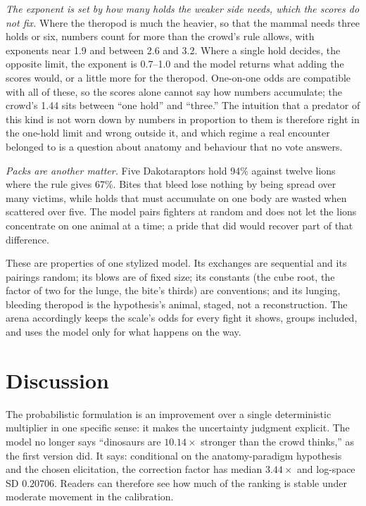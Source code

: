 \documentclass[11pt]{article}
\begin{document}
\emph{The exponent is set by how many holds the weaker side needs, which the scores do not fix.} Where the theropod is much the heavier, so that the mammal needs three holds or six, numbers count for more than the crowd's rule allows, with exponents near 1.9 and between 2.6 and 3.2. Where a single hold decides, the opposite limit, the exponent is 0.7--1.0 and the model returns what adding the scores would, or a little more for the theropod. One-on-one odds are compatible with all of these, so the scores alone cannot say how numbers accumulate; the crowd's 1.44 sits between ``one hold'' and ``three.'' The intuition that a predator of this kind is not worn down by numbers in proportion to them is therefore right in the one-hold limit and wrong outside it, and which regime a real encounter belonged to is a question about anatomy and behaviour that no vote answers.

\emph{Packs are another matter.} Five Dakotaraptors hold 94\% against twelve lions where the rule gives 67\%. Bites that bleed lose nothing by being spread over many victims, while holds that must accumulate on one body are wasted when scattered over five. The model pairs fighters at random and does not let the lions concentrate on one animal at a time; a pride that did would recover part of that difference.

These are properties of one stylized model. Its exchanges are sequential and its pairings random; its blows are of fixed size; its constants (the cube root, the factor of two for the lunge, the bite's thirds) are conventions; and its lunging, bleeding theropod is the hypothesis's animal, staged, not a reconstruction. The arena accordingly keeps the scale's odds for every fight it shows, groups included, and uses the model only for what happens on the way.

\section{Discussion}

The probabilistic formulation is an improvement over a single deterministic multiplier in one specific sense: it makes the uncertainty judgment explicit. The model no longer says ``dinosaurs are $10.14\times$ stronger than the crowd thinks,'' as the first version did. It says: conditional on the anatomy-paradigm hypothesis and the chosen elicitation, the correction factor has median $3.44\times$ and log-space SD $0.20706$. Readers can therefore see how much of the ranking is stable under moderate movement in the calibration.
\end{document}
